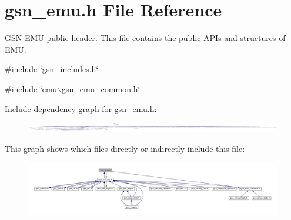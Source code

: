 \hypertarget{a00489}{
\section{gsn\_\-emu.h File Reference}
\label{a00489}
}


GSN EMU public header. This file contains the public APIs and structures of EMU.  


{\ttfamily \#include \char`\"{}gsn\_\-includes.h\char`\"{}}\par
{\ttfamily \#include \char`\"{}emu$\backslash$gsn\_\-emu\_\-common.h\char`\"{}}\par
Include dependency graph for gsn\_\-emu.h:
\nopagebreak
\begin{figure}[H]
\begin{center}
\leavevmode
\includegraphics[width=400pt]{a00718}
\end{center}
\end{figure}
This graph shows which files directly or indirectly include this file:
\nopagebreak
\begin{figure}[H]
\begin{center}
\leavevmode
\includegraphics[width=400pt]{a00719}
\end{center}
\end{figure}
